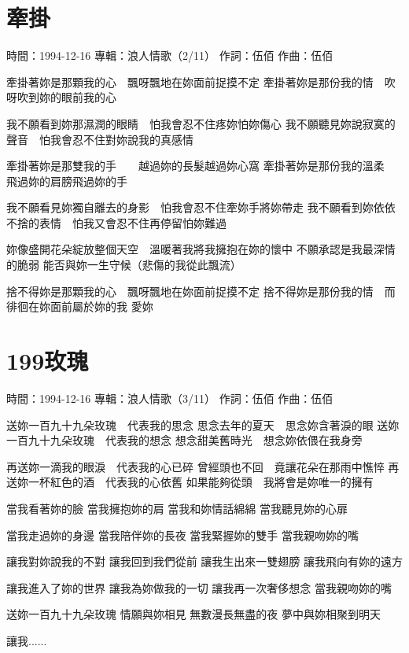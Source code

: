 \documentclass[UTF8,a4paper,oneside,twocolumn,12pt]{ctexbook}
\newcommand{\infopair}[2]{\textbullet #1：#2}
\newcommand{\zc}[1][伍佰]{\infopair{作詞}{#1}}
\newcommand{\zq}[1][伍佰]{\infopair{作曲}{#1}}
\newcommand{\zj}[1]{\infopair{專輯}{#1}}
\newcommand{\sj}[1]{\infopair{時間}{#1}}
\newenvironment{info}{\begin{flushleft}\kaishu
	}
	{\end{flushleft}\normalsize\yahei\par}
\newenvironment{lyric}{
	}
{}
\begin{document}
\section{牽掛}
\begin{info}
	\sj{1994-12-16}
	\zj{浪人情歌（2/11）}
	\zc
	\zq
\end{info}
\begin{lyric}
	牽掛著妳是那顆我的心　飄呀飄地在妳面前捉摸不定
	牽掛著妳是那份我的情　吹呀吹到妳的眼前我的心

	我不願看到妳那濕潤的眼睛　怕我會忍不住疼妳怕妳傷心
	我不願聽見妳說寂寞的聲音　怕我會忍不住對妳說我的真感情

	牽掛著妳是那雙我的手　　越過妳的長髮越過妳心窩
	牽掛著妳是那份我的溫柔　飛過妳的肩膀飛過妳的手

	我不願看見妳獨自離去的身影　怕我會忍不住牽妳手將妳帶走
	我不願看到妳依依不捨的表情　怕我又會忍不住再停留怕妳難過

	妳像盛開花朵綻放整個天空　溫暖著我將我擁抱在妳的懷中
	不願承認是我最深情的脆弱
	能否與妳一生守候（悲傷的我從此飄流）

	捨不得妳是那顆我的心　飄呀飄地在妳面前捉摸不定
	捨不得妳是那份我的情　而徘徊在妳面前屬於妳的我
	愛妳
\end{lyric}

\section{199玫瑰}
\begin{info}
	\sj{1994-12-16}
	\zj{浪人情歌（3/11）}
	\zc
	\zq
\end{info}
\begin{lyric}
	送妳一百九十九朵玫瑰　代表我的思念
	思念去年的夏天　思念妳含著淚的眼
	送妳一百九十九朵玫瑰　代表我的想念
	想念甜美舊時光　想念妳依偎在我身旁

	再送妳一滴我的眼淚　代表我的心已碎
	曾經頭也不回　竟讓花朵在那雨中憔悴
	再送妳一杯紅色的酒　代表我的心依舊
	如果能夠從頭　我將會是妳唯一的擁有

	當我看著妳的臉
	當我擁抱妳的肩
	當我和妳情話綿綿
	當我聽見妳的心扉

	當我走過妳的身邊
	當我陪伴妳的長夜
	當我緊握妳的雙手
	當我親吻妳的嘴

	讓我對妳說我的不對
	讓我回到我們從前
	讓我生出來一雙翅膀
	讓我飛向有妳的遠方

	讓我進入了妳的世界
	讓我為妳做我的一切
	讓我再一次奢侈想念
	當我親吻妳的嘴

	送妳一百九十九朵玫瑰
	情願與妳相見
	無數漫長無盡的夜
	夢中與妳相聚到明天

	讓我......
\end{lyric}
\end{document}
